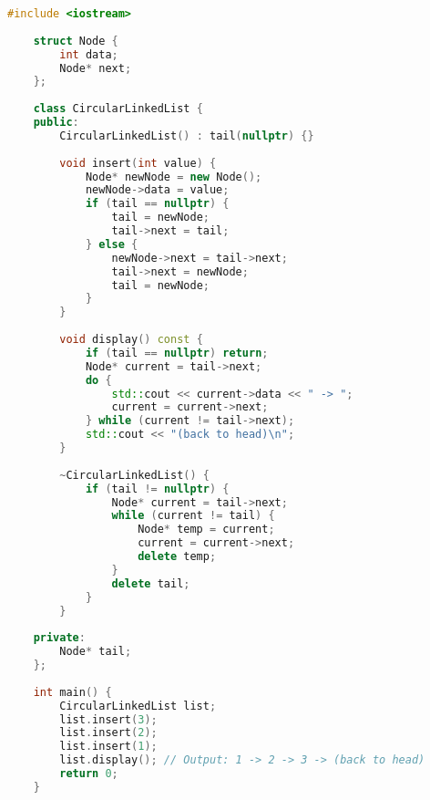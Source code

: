     \begin{lstlisting}[language=C++]
    #include <iostream>
    
    struct Node {
        int data;
        Node* next;
    };
    
    class CircularLinkedList {
    public:
        CircularLinkedList() : tail(nullptr) {}
        
        void insert(int value) {
            Node* newNode = new Node();
            newNode->data = value;
            if (tail == nullptr) {
                tail = newNode;
                tail->next = tail;
            } else {
                newNode->next = tail->next;
                tail->next = newNode;
                tail = newNode;
            }
        }
        
        void display() const {
            if (tail == nullptr) return;
            Node* current = tail->next;
            do {
                std::cout << current->data << " -> ";
                current = current->next;
            } while (current != tail->next);
            std::cout << "(back to head)\n";
        }
    
        ~CircularLinkedList() {
            if (tail != nullptr) {
                Node* current = tail->next;
                while (current != tail) {
                    Node* temp = current;
                    current = current->next;
                    delete temp;
                }
                delete tail;
            }
        }
    
    private:
        Node* tail;
    };
    
    int main() {
        CircularLinkedList list;
        list.insert(3);
        list.insert(2);
        list.insert(1);
        list.display(); // Output: 1 -> 2 -> 3 -> (back to head)
        return 0;
    }
    \end{lstlisting}
    
